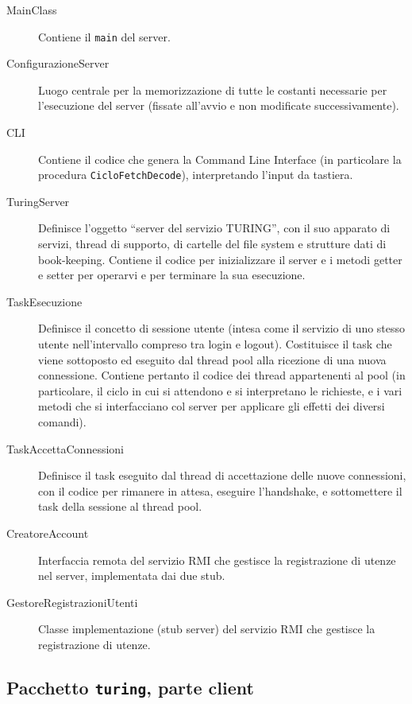 \documentclass[a4paper,12pt]{article}
\begin{document}
 \begin{description}
  \item[MainClass] Contiene il \texttt{main} del server.
  
  \item[ConfigurazioneServer] Luogo centrale per la memorizzazione di tutte le costanti necessarie per l'esecuzione del server (fissate all'avvio e non modificate successivamente).
  
  \item[CLI] Contiene il codice che genera la Command Line Interface (in particolare la procedura \texttt{CicloFetchDecode}), interpretando l'input da tastiera.
  
  \item[TuringServer] Definisce l'oggetto ``server del servizio TURING'', con il suo apparato di servizi, thread di supporto, di cartelle del file system e strutture dati di book-keeping. Contiene il codice per inizializzare il server e i metodi getter e setter per operarvi e per terminare la sua esecuzione.
  
  \item[TaskEsecuzione] Definisce il concetto di sessione utente (intesa come il servizio di uno stesso utente nell'intervallo compreso tra login e logout). Costituisce il task che viene sottoposto ed eseguito dal thread pool alla ricezione di una nuova connessione. Contiene pertanto il codice dei thread appartenenti al pool (in particolare, il ciclo in cui si attendono e si interpretano le richieste, e i vari metodi che si interfacciano col server per applicare gli effetti dei diversi comandi).
  
  \item[TaskAccettaConnessioni] Definisce il task eseguito dal thread di accettazione delle nuove connessioni, con il codice per rimanere in attesa, eseguire l'handshake, e sottomettere il task della sessione al thread pool.
  
  \item[CreatoreAccount] Interfaccia remota del servizio RMI che gestisce la registrazione di utenze nel server, implementata dai due stub.
  
  \item[GestoreRegistrazioniUtenti] Classe implementazione (stub server) del servizio RMI che gestisce la registrazione di utenze.
 \end{description}
 
  \subsection{ Pacchetto \texttt{turing}, parte client }
  
\end{document}
